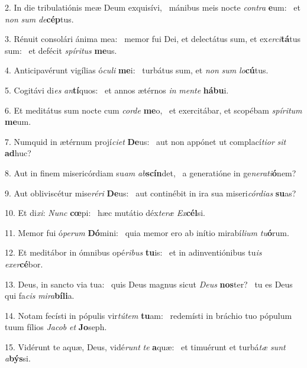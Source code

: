 2. In die tribulatiónis meæ Deum exquisívi, \dag\  mánibus meis nocte \textit{con}\textit{tra} \textbf{e}um: \ast\  et \textit{non} \textit{sum} \textit{de}\textbf{cép}tus.\

3. Rénuit consolári ánima mea: \dag\  memor fui Dei, et delectátus sum, et ex\textit{er}\textit{ci}\textbf{tá}tus sum: \ast\  et defécit \textit{spí}\textit{ri}\textit{tus} \textbf{me}us.\

4. Anticipavérunt vigílias ó\textit{cu}\textit{li} \textbf{me}i: \ast\  turbátus sum, et \textit{non} \textit{sum} \textit{lo}\textbf{cú}tus.\

5. Cogitávi di\textit{es} \textit{an}\textbf{tí}quos: \ast\  et annos ætérnos \textit{in} \textit{men}\textit{te} \textbf{há}\textbf{bu}i.\

6. Et meditátus sum nocte cum \textit{cor}\textit{de} \textbf{me}o, \ast\  et exercitábar, et scopébam \textit{spí}\textit{ri}\textit{tum} \textbf{me}um.\

7. Numquid in ætérnum projí\textit{ci}\textit{et} \textbf{De}us: \ast\  aut non appónet ut complací\textit{ti}\textit{or} \textit{sit} \textbf{ad}huc?\

8. Aut in finem misericórdiam su\textit{am} \textit{ab}\textbf{scín}det, \ast\  a generatióne in ge\textit{ne}\textit{ra}\textit{ti}\textbf{ó}nem?\

9. Aut obliviscétur mise\textit{ré}\textit{ri} \textbf{De}us: \ast\  aut continébit in ira sua miseri\textit{cór}\textit{di}\textit{as} \textbf{su}as?\

10. Et di\textit{xi}: \textit{Nunc} \textbf{cœ}pi: \ast\  hæc mutátio déx\textit{te}\textit{ræ} \textit{Ex}\textbf{cél}si.\

11. Memor fui ó\textit{pe}\textit{rum} \textbf{Dó}mini: \ast\  quia memor ero ab inítio mirabí\textit{li}\textit{um} \textit{tu}\textbf{ó}rum.\

12. Et meditábor in ómnibus opé\textit{ri}\textit{bus} \textbf{tu}is: \ast\  et in adinventiónibus tu\textit{is} \textit{ex}\textit{er}\textbf{cé}bor.\

13. Deus, in sancto via tua: \dag\  quis Deus magnus sicut \textit{De}\textit{us} \textbf{nos}ter? \ast\  tu es Deus qui fa\textit{cis} \textit{mi}\textit{ra}\textbf{bí}\textbf{li}a.\

14. Notam fecísti in pópulis vir\textit{tú}\textit{tem} \textbf{tu}am: \ast\  redemísti in bráchio tuo pópulum tuum fílios \textit{Ja}\textit{cob} \textit{et} \textbf{Jo}seph.\

15. Vidérunt te aquæ, Deus, vidé\textit{runt} \textit{te} \textbf{a}quæ: \ast\  et timuérunt et turbá\textit{tæ} \textit{sunt} \textit{a}\textbf{býs}si.\

